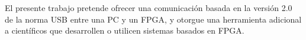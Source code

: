 El presente trabajo pretende ofrecer una comunicación basada en la versión 2.0 de la norma USB entre una PC y un FPGA, y otorgue una herramienta adicional a científicos que desarrollen o utilicen sistemas basados en FPGA.\\
%
%
%
%
%




